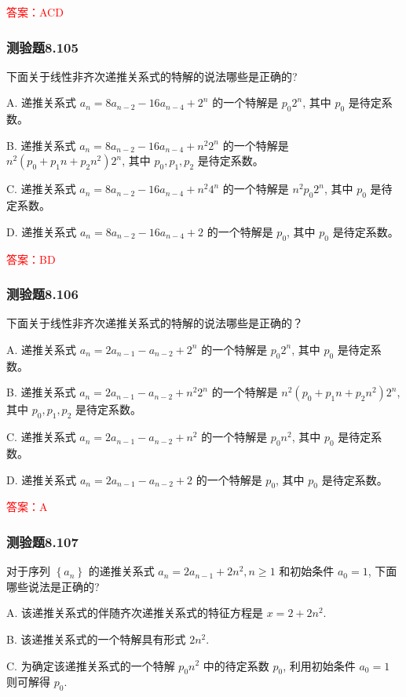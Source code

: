 \documentclass[UTF8, heading=true]{ctexart}
\begin{document}
\textcolor{red}{答案：ACD}

\subsubsection{测验题8.105}

下面关于线性非齐次递推关系式的特解的说法哪些是正确的?

A. 递推关系式 $a_n=8 a_{n-2}-16 a_{n-4}+2^n$ 的一个特解是 $p_0 2^n$, 其中 $p_0$ 是待定系数。

B. 递推关系式 $a_n=8 a_{n-2}-16 a_{n-4}+n^2 2^n$ 的一个特解是 $n^2\left(p_0+p_1 n+p_2 n^2\right) 2^n$, 其中 $p_0, p_1, p_2$ 是待定系数。

C. 递推关系式 $a_n=8 a_{n-2}-16 a_{n-4}+n^2 4^n$ 的一个特解是 $n^2 p_0 2^n$, 其中 $p_0$ 是待定系数。

D. 递推关系式 $a_n=8 a_{n-2}-16 a_{n-4}+2$ 的一个特解是 $p_0$, 其中 $p_0$ 是待定系数。

\textcolor{red}{答案：BD}

\subsubsection{测验题8.106}

下面关于线性非齐次递推关系式的特解的说法哪些是正确的？

A. 递推关系式 $a_n=2 a_{n-1}-a_{n-2}+2^n$ 的一个特解是 $p_0 2^n$, 其中 $p_0$ 是待定系数。

B. 递推关系式 $a_n=2 a_{n-1}-a_{n-2}+n^2 2^n$ 的一个特解是 $n^2\left(p_0+p_1 n+p_2 n^2\right) 2^n$, 其中 $p_0, p_1, p_2$ 是待定系数。

C. 递推关系式 $a_n=2 a_{n-1}-a_{n-2}+n^2$ 的一个特解是 $p_0 n^2$, 其中 $p_0$ 是待定系数。

D. 递推关系式 $a_n=2 a_{n-1}-a_{n-2}+2$ 的一个特解是 $p_0$, 其中 $p_0$ 是待定系数。

\textcolor{red}{答案：A}

\subsubsection{测验题8.107}
对于序列 $\left\{a_n\right\}$ 的递推关系式 $a_n=2 a_{n-1}+2 n^2, n \geq 1$ 和初始条件 $a_0=1$, 下面哪些说法是正确的?

A. 该递推关系式的伴随齐次递推关系式的特征方程是 $x=2+2 n^2$.

B. 该递推关系式的一个特解具有形式 $2 n^2$.

C. 为确定该递推关系式的一个特解 $p_0 n^2$ 中的待定系数 $p_0$, 利用初始条件 $a_0=1$ 则可解得 $p_0$.
\end{document}
